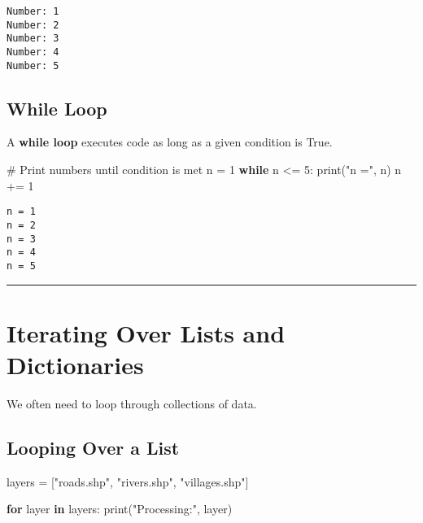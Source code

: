 \documentclass[
  11pt,
  letterpaper,
]{book}
\newenvironment{Shaded}{\begin{snugshade}}{\end{snugshade}}
\newcommand{\BuiltInTok}[1]{\textcolor[rgb]{0.00,0.23,0.31}{#1}}
\newcommand{\CommentTok}[1]{\textcolor[rgb]{0.37,0.37,0.37}{#1}}
\newcommand{\ControlFlowTok}[1]{\textcolor[rgb]{0.00,0.23,0.31}{\textbf{#1}}}
\newcommand{\DecValTok}[1]{\textcolor[rgb]{0.68,0.00,0.00}{#1}}
\newcommand{\KeywordTok}[1]{\textcolor[rgb]{0.00,0.23,0.31}{\textbf{#1}}}
\newcommand{\NormalTok}[1]{\textcolor[rgb]{0.00,0.23,0.31}{#1}}
\newcommand{\OperatorTok}[1]{\textcolor[rgb]{0.37,0.37,0.37}{#1}}
\newcommand{\StringTok}[1]{\textcolor[rgb]{0.13,0.47,0.30}{#1}}
\begin{document}
\begin{verbatim}
Number: 1
Number: 2
Number: 3
Number: 4
Number: 5
\end{verbatim}

\subsection{While Loop}\label{while-loop}

A \textbf{while loop} executes code as long as a given condition is
True.

\begin{Shaded}
\begin{Highlighting}[]
\CommentTok{\# Print numbers until condition is met}
\NormalTok{n }\OperatorTok{=} \DecValTok{1}
\ControlFlowTok{while}\NormalTok{ n }\OperatorTok{\textless{}=} \DecValTok{5}\NormalTok{:}
    \BuiltInTok{print}\NormalTok{(}\StringTok{"n ="}\NormalTok{, n)}
\NormalTok{    n }\OperatorTok{+=} \DecValTok{1}
\end{Highlighting}
\end{Shaded}

\begin{verbatim}
n = 1
n = 2
n = 3
n = 4
n = 5
\end{verbatim}

\begin{center}\rule{0.5\linewidth}{0.5pt}\end{center}

\section{Iterating Over Lists and
Dictionaries}\label{iterating-over-lists-and-dictionaries}

We often need to loop through collections of data.

\subsection{Looping Over a List}\label{looping-over-a-list}

\begin{Shaded}
\begin{Highlighting}[]
\NormalTok{layers }\OperatorTok{=}\NormalTok{ [}\StringTok{"roads.shp"}\NormalTok{, }\StringTok{"rivers.shp"}\NormalTok{, }\StringTok{"villages.shp"}\NormalTok{]}

\ControlFlowTok{for}\NormalTok{ layer }\KeywordTok{in}\NormalTok{ layers:}
    \BuiltInTok{print}\NormalTok{(}\StringTok{"Processing:"}\NormalTok{, layer)}
\end{Highlighting}
\end{Shaded}
\end{document}
